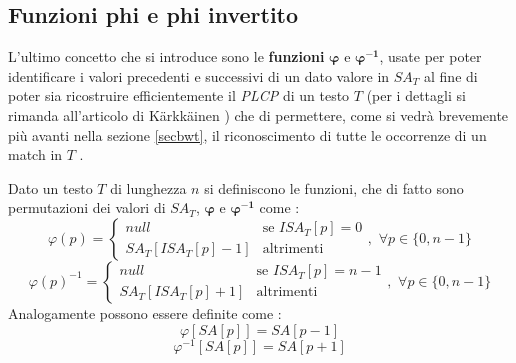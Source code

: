 \subsection{Funzioni phi e phi invertito}
L'ultimo concetto che si introduce sono le \textbf{funzioni}
$\boldsymbol\varphi$ e $\mathbf{\boldsymbol\varphi^{-1}}$, usate per poter
identificare i valori precedenti e successivi di 
un dato valore in $SA_T$ al fine di poter sia ricostruire efficientemente il
\textit{PLCP} di un testo $T$ (per i dettagli si rimanda all'articolo di
K\"{a}rkk\"{a}inen \cite{plcp}) che di permettere, come si vedrà brevemente più 
avanti nella sezione \ref{secbwt}, il riconoscimento di tutte le occorrenze di
un match in $T$ \cite{phoni}.
\begin{definizione}
  Dato un testo $T$ di lunghezza $n$ si definiscono le funzioni, che di fatto
  sono permutazioni dei valori di $SA_T$, $\boldsymbol\varphi$ e
  $\mathbf{\boldsymbol\varphi^{-1}}$ come \cite{phoni}: 
  \[\varphi(p)=
    \begin{cases}
      null&\mbox{se } ISA_T[p]=0\\
      SA_T[ISA_T[p]-1]&\mbox{altrimenti}
    \end{cases},\,\,\forall p\in\{0,n-1\}
  \]
   \[\varphi(p)^{-1}=
    \begin{cases}
      null&\mbox{se } ISA_T[p]=n-1\\
      SA_T[ISA_T[p]+1]&\mbox{altrimenti}
    \end{cases},\,\,\forall p\in\{0,n-1\}
  \]
  Analogamente possono essere definite come \cite{plcp}:
  \[\varphi[SA[p]]=SA[p-1]\]
  \[\varphi^{-1}[SA[p]]=SA[p+1]\]
\end{definizione}
